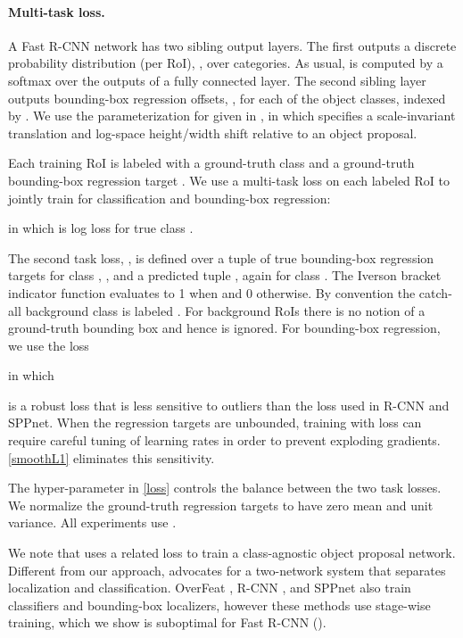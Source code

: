 \documentclass[10pt,twocolumn,letterpaper]{article}
\newcommand{\roi}{RoI\xspace}
\begin{document}
\paragraph{Multi-task loss.}
A Fast R-CNN network has two sibling output layers.
The first outputs a discrete probability distribution (per \roi), , over  categories.
As usual,  is computed by a softmax over the  outputs of a fully connected layer.
The second sibling layer outputs bounding-box regression offsets, , for each of the  object classes, indexed by .
We use the parameterization for  given in \cite{girshick2014rcnn}, in which  specifies a scale-invariant translation and log-space height/width shift relative to an object proposal.

Each training \roi is labeled with a ground-truth class  and a ground-truth bounding-box regression target .
We use a multi-task loss  on each labeled {\roi} to jointly train for classification and bounding-box regression:

in which  is log loss for true class .

The second task loss, , is defined over a tuple of true bounding-box regression targets for class , , and a predicted tuple , again for class .
The Iverson bracket indicator function  evaluates to 1 when  and 0 otherwise.
By convention the catch-all background class is labeled .
For background {\roi}s there is no notion of a ground-truth bounding box and hence  is ignored.
For bounding-box regression, we use the loss

in which

is a robust  loss that is less sensitive to outliers than the  loss used in R-CNN and SPPnet.
When the regression targets are unbounded, training with  loss can require careful tuning of learning rates in order to prevent exploding gradients.
\eqref{smoothL1} eliminates this sensitivity.

The hyper-parameter  in \eqref{loss} controls the balance between the two task losses.
We normalize the ground-truth regression targets  to have zero mean and unit variance.
All experiments use .

We note that \cite{erhan2014scalable} uses a related loss to train a class-agnostic object proposal network.
Different from our approach, \cite{erhan2014scalable} advocates for a two-network system that separates localization and classification.
OverFeat \cite{overfeat}, R-CNN \cite{girshick2014rcnn}, and SPPnet \cite{he2014spp} also train classifiers and bounding-box localizers, however these methods use stage-wise training, which we show is suboptimal for Fast R-CNN ().
\end{document}
